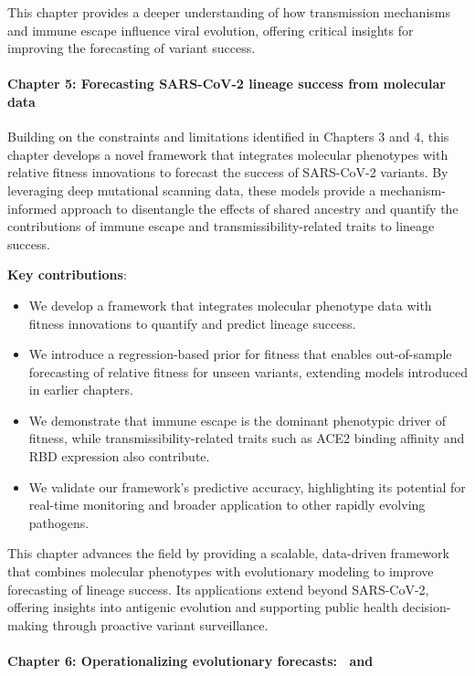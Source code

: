 This chapter provides a deeper understanding of how transmission mechanisms and immune escape influence viral evolution, offering critical insights for improving the forecasting of variant success.

\paragraph{Chapter 5: Forecasting SARS-CoV-2 lineage success from molecular data}

Building on the constraints and limitations identified in Chapters 3 and 4, this chapter develops a novel framework that integrates molecular phenotypes with relative fitness innovations to forecast the success of SARS-CoV-2 variants.
By leveraging deep mutational scanning data, these models provide a mechanism-informed approach to disentangle the effects of shared ancestry and quantify the contributions of immune escape and transmissibility-related traits to lineage success.

\noindent\textbf{Key contributions}:
\begin{itemize}
  \item  We develop a framework that integrates molecular phenotype data with fitness innovations to quantify and predict lineage success.
  \item We introduce a regression-based prior for fitness that enables out-of-sample forecasting of relative fitness for unseen variants, extending models introduced in earlier chapters.
  \item We demonstrate that immune escape is the dominant phenotypic driver of fitness, while transmissibility-related traits such as ACE2 binding affinity and RBD expression also contribute.
  \item We validate our framework’s predictive accuracy, highlighting its potential for real-time monitoring and broader application to other rapidly evolving pathogens.
\end{itemize}

This chapter advances the field by providing a scalable, data-driven framework that combines molecular phenotypes with evolutionary modeling to improve forecasting of lineage success.
Its applications extend beyond SARS-CoV-2, offering insights into antigenic evolution and supporting public health decision-making through proactive variant surveillance.

\paragraph{Chapter 6: Operationalizing evolutionary forecasts: \evofr\ and \forecastsNcov}

